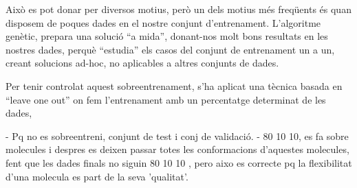\documentclass[titlepage,a4paper,12pt]{book}
\begin{document}
Això es pot donar per diversos motius, però un dels motius més freqüents és quan
disposem de poques dades en el nostre conjunt d'entrenament.  L'algoritme
genètic, prepara una solució ``a mida'', donant-nos molt bons resultats en les
nostres dades, perquè ``estudia'' els casos del conjunt de entrenament un a un,
creant solucions ad-hoc, no aplicables a altres conjunts de dades.

Per tenir controlat aquest sobreentrenament, s'ha aplicat una tècnica basada en
``leave one out'' on fem l'entrenament amb un percentatge determinat de les
dades, 

- Pq no es sobreentreni, conjunt de test i conj de validació.
- 80 10 10, es fa sobre molecules i despres es deixen passar totes les
conformacions d'aquestes molecules, fent que les dades finals no siguin 80 10 10
, pero aixo es correcte pq la flexibilitat d'una molecula es part de la seva
'qualitat'.


\end{document}
